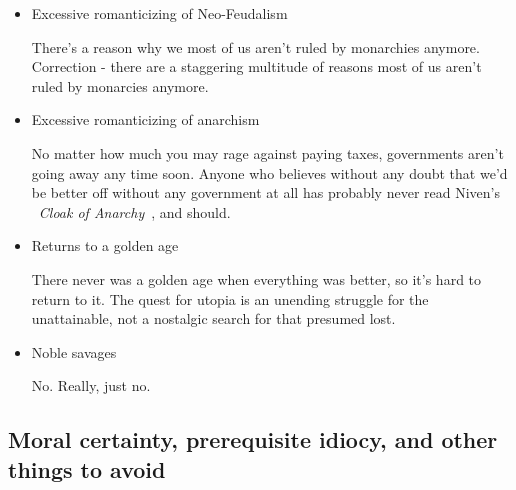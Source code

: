 \begin{itemize}
\begin{itemize}
\item Excessive romanticizing of Neo-Feudalism

There's a reason why we most of us aren't ruled by monarchies
anymore. Correction - there are a staggering multitude of reasons most
of us aren't ruled by monarcies anymore.

\item Excessive romanticizing of anarchism

No matter how much you may rage against paying taxes, governments
aren't going away any time soon. Anyone who believes without any doubt
that we'd be better off without any government at all has probably
never read Niven's ~\emph{Cloak of
Anarchy}~\cite{PurpleRobeofAnarchy}, and should.

\item Returns to a golden age

There never was a golden age when everything was better, so it's hard
to return to it. The quest for utopia is an unending struggle for the
unattainable, not a nostalgic search for that presumed lost.

\item Noble savages

No. Really, just no.

\end{itemize}

\end{itemize}

\subsection{Moral certainty, prerequisite idiocy, and other things to avoid} 

